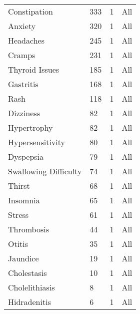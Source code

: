 \documentclass[referee,bst/sn-basic]{sn-jnl}%
\theoremstyle{thmstyletwo}%
\theoremstyle{thmstylethree}%
\begin{document}
\begin{appendices}
\begin{longtable}{llll}
Constipation                             & 333       & 1    & All                     \\
Anxiety                                  & 320       & 1    & All                     \\
Headaches                                & 245       & 1    & All                     \\
Cramps                                   & 231       & 1    & All                     \\
Thyroid Issues                           & 185       & 1    & All                     \\
Gastritis                                & 168       & 1    & All                     \\
Rash                                     & 118       & 1    & All                     \\
Dizziness                                & 82        & 1    & All                     \\
Hypertrophy                              & 82        & 1    & All                     \\
Hypersensitivity                         & 80        & 1    & All                     \\
Dyspepsia                                & 79        & 1    & All                     \\
Swallowing Difficulty                    & 74        & 1    & All                     \\
Thirst                                   & 68        & 1    & All                     \\
Insomnia                                 & 65        & 1    & All                     \\
Stress                                   & 61        & 1    & All                     \\
Thrombosis                               & 44        & 1    & All                     \\
Otitis                                   & 35        & 1    & All                     \\
Jaundice                                 & 19        & 1    & All                     \\
Cholestasis                              & 10        & 1    & All                     \\
Cholelithiasis                           & 8         & 1    & All                     \\
Hidradenitis                             & 6         & 1    & All                     \\

\end{longtable}
\end{appendices}
\end{document}
